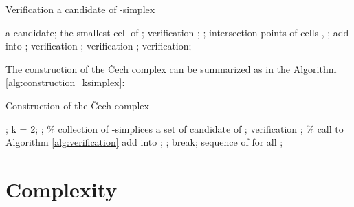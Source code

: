 \documentclass[conference]{IEEEtran}
\begin{document}
\begin{algorithm}[H]
\caption{Verification a candidate of -simplex}
\label{alg:verification}
\begin{algorithmic}
\REQUIRE  a candidate;
	\STATE  the smallest cell of ;
		\STATE verification ; 
	\ELSE
		\STATE ;
		\FOR{}
			\FOR{}
				\STATE  intersection points of cells , ;
				\STATE add  into ;
			\ENDFOR
		\ENDFOR
			\STATE verification ;
		\ELSE
			\STATE verification ;
		\ENDIF
	\ENDIF
	\RETURN verification;
\end{algorithmic}
\end{algorithm}
\vspace{-1mm}
The construction of the \v{C}ech complex can be summarized as in the Algorithm \ref{alg:construction_ksimplex}:
\vspace{-1mm}
\begin{algorithm}[H]
\caption{Construction of the \v{C}ech complex}
\label{alg:construction_ksimplex}
\begin{algorithmic}
;
\STATE k = 2;
	\STATE ; \% collection of -simplices
		\STATE  a set of candidate  of ;
			\STATE verification ; \% call to Algorithm \ref{alg:verification}
\IF{}
				\STATE add  into ;
			\ENDIF
		\ENDFOR
	\ENDFOR
	\IF{}
		\STATE ;
	\ELSE
		\STATE break;
	\ENDIF
\ENDWHILE
\RETURN sequence of  for all ;
\end{algorithmic}
\end{algorithm}
















\section{Complexity}
\end{document}
